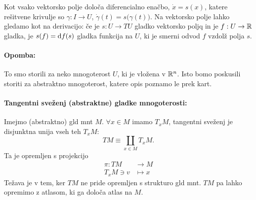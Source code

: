 Kot vsako vektorsko polje dolo\v ca diferencialno ena\v cbo, $\dot{x} = s(x)$, katere re\v sitvene krivulje so $\gamma : I \to U$, $\dot{\gamma}(t) =
s\big(\gamma(t)\big)$. Na vektorsko polje lahko gledamo kot na derivacijo: \v ce je $s : U \to TU$ gladko vektorsko poljq in je $f : U \to \mathbb{R}$ gladka,
je $s(f) = \text{d} f(s)$ gladka funkcija na $U$, ki je smerni odvod $f$ vzdol\v z polja $s$.

\paragraph{Opomba:} To smo storili za neko mnogoterost $U$, ki je vlo\v zena v $\mathbb{R}^n$. Isto bomo poskusili storiti za abstraktno mnogoterost, katere
opis poznamo le prek kart.

\begin{defin}
	\paragraph{Tangentni sve\v zenj (abstraktne) gladke mnogoterosti:} Imejmo (abstraktno) gld mnt $M$. $\forall x \in M$ imamo $T_x M$, tangentni
	sve\v zenj je disjunktna unija vseh teh $T_x M$:
	\[
		TM \equiv \coprod_{x \in M} T_xM.
	\]
	Ta je opremljen s projekcijo 
	\begin{align*}
		\pi : TM &\to M \\
		T_xM \owns v &\mapsto x
	\end{align*}
	Te\v zava je v tem, ker $TM$ ne pride opremljen s strukturo gld mnt. $TM$ pa lahko opremimo z atlasom, ki ga dolo\v ca atlas na $M$.
\end{defin}
